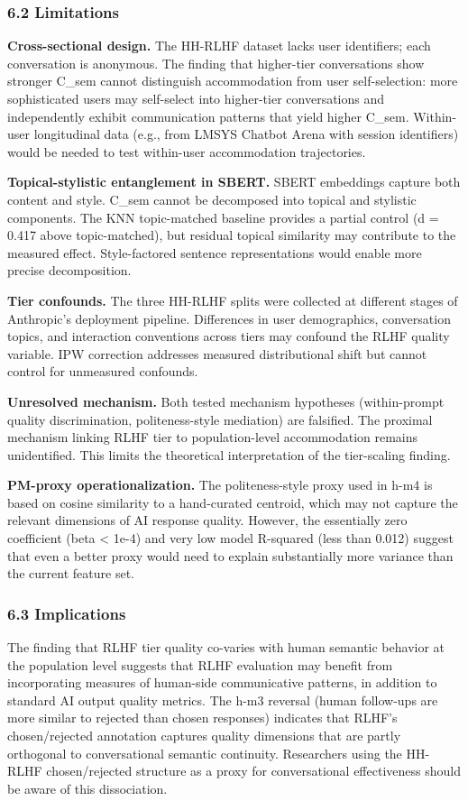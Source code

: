 \subsubsection{6.2 Limitations}

\textbf{Cross-sectional design.} The HH-RLHF dataset lacks user identifiers; each conversation is anonymous. The finding that higher-tier conversations show stronger C\_sem cannot distinguish accommodation from user self-selection: more sophisticated users may self-select into higher-tier conversations and independently exhibit communication patterns that yield higher C\_sem. Within-user longitudinal data (e.g., from LMSYS Chatbot Arena with session identifiers) would be needed to test within-user accommodation trajectories.

\textbf{Topical-stylistic entanglement in SBERT.} SBERT embeddings capture both content and style. C\_sem cannot be decomposed into topical and stylistic components. The KNN topic-matched baseline provides a partial control (d = 0.417 above topic-matched), but residual topical similarity may contribute to the measured effect. Style-factored sentence representations would enable more precise decomposition.

\textbf{Tier confounds.} The three HH-RLHF splits were collected at different stages of Anthropic's deployment pipeline. Differences in user demographics, conversation topics, and interaction conventions across tiers may confound the RLHF quality variable. IPW correction addresses measured distributional shift but cannot control for unmeasured confounds.

\textbf{Unresolved mechanism.} Both tested mechanism hypotheses (within-prompt quality discrimination, politeness-style mediation) are falsified. The proximal mechanism linking RLHF tier to population-level accommodation remains unidentified. This limits the theoretical interpretation of the tier-scaling finding.

\textbf{PM-proxy operationalization.} The politeness-style proxy used in h-m4 is based on cosine similarity to a hand-curated centroid, which may not capture the relevant dimensions of AI response quality. However, the essentially zero coefficient (beta < 1e-4) and very low model R-squared (less than 0.012) suggest that even a better proxy would need to explain substantially more variance than the current feature set.

\subsubsection{6.3 Implications}

The finding that RLHF tier quality co-varies with human semantic behavior at the population level suggests that RLHF evaluation may benefit from incorporating measures of human-side communicative patterns, in addition to standard AI output quality metrics. The h-m3 reversal (human follow-ups are more similar to rejected than chosen responses) indicates that RLHF's chosen/rejected annotation captures quality dimensions that are partly orthogonal to conversational semantic continuity. Researchers using the HH-RLHF chosen/rejected structure as a proxy for conversational effectiveness should be aware of this dissociation.
